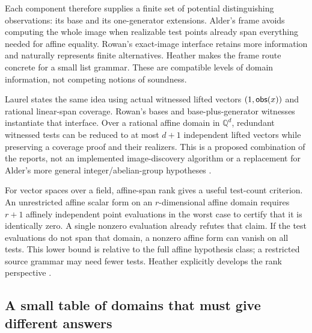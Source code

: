 \documentclass[11pt,letterpaper]{article}
\newcommand{\Q}{\mathbb Q}\newcommand{\R}{\mathbb R}
\theoremstyle{definition}\newtheorem{definition}[proposition]{Definition}
\theoremstyle{remark}\newtheorem{remark}[proposition]{Remark}
\begin{document}
Each component therefore supplies a finite set of potential distinguishing
observations: its base and its one-generator extensions. Alder's frame
avoids computing the whole image when realizable test points already span
everything needed for affine equality. Rowan's exact-image interface retains
more information and naturally represents finite alternatives. Heather makes
the frame route concrete for a small list grammar. These are compatible
levels of domain information, not competing notions of soundness.

Laurel states the same idea using actual witnessed lifted vectors
$(1,\mathsf{obs}(x))$ and rational linear-span coverage. Rowan's bases and
base-plus-generator witnesses instantiate that interface. Over a rational
affine domain in $\Q^d$, redundant witnessed tests can be reduced to at most
$d+1$ independent lifted vectors while preserving a coverage proof and their
realizers. This is a proposed combination of the reports, not an implemented
image-discovery algorithm or a replacement for Alder's more general
integer/abelian-group hypotheses \cite{laurel,rowan}.

For vector spaces over a field, affine-span rank gives a useful test-count
criterion. An unrestricted affine scalar form on an $r$-dimensional affine
domain requires $r+1$ affinely independent point evaluations in the worst
case to certify that it is identically zero. A single nonzero evaluation
already refutes that claim. If the test evaluations do not span that
domain, a nonzero affine form can vanish on all tests. This lower bound is
relative to the full affine hypothesis class; a restricted source grammar
may need fewer tests. Heather explicitly develops the rank perspective
\cite{heather}.

\subsection{A small table of domains that must give different answers}
\end{document}
